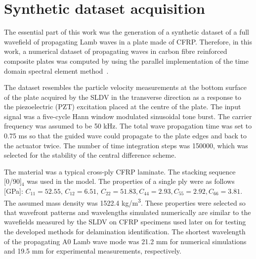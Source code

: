 \section{Synthetic dataset acquisition}
\label{sec41}
The essential part of this work was the generation of a synthetic dataset of a full wavefield of propagating Lamb waves in a plate made of CFRP.
Therefore, in this work, a numerical dataset of propagating waves in carbon fibre reinforced composite plates was computed by using the parallel implementation of the time domain spectral element method~\cite{Kudela2020}.

The dataset resembles the particle velocity measurements at the bottom surface of the plate acquired by the SLDV in the transverse direction as a response to the piezoelectric (PZT) excitation placed at the centre of the plate. 
The input signal was a five-cycle Hann window modulated sinusoidal tone burst. 
The carrier frequency was assumed to be 50 kHz. 
The total wave propagation time was set to 0.75 ms so that the guided wave could propagate to the plate edges and back to the actuator twice.
The number of time integration steps was 150000, which was selected for the stability of the central difference scheme.

The material was a typical cross-ply CFRP laminate. 
The stacking sequence [0/90]\(_4\) was used in the model. 
The properties of a single ply were as follows [GPa]:
\(C_{11} = 52.55, \, C_{12} = 6.51, \, C_{22} = 51.83, C_{44} = 2.93, C_{55} = 2.92, C_{66} = 3.81\). 
The assumed mass density was 1522.4 kg/m\textsuperscript{3}.
These properties were selected so that wavefront patterns and wavelengths simulated numerically are similar to the wavefields measured by the SLDV on CFRP specimens used later on for testing the developed methods for delamination identification.
The shortest wavelength of the propagating A0 Lamb wave mode was 21.2 mm for numerical simulations and 19.5 mm for experimental measurements, respectively.

